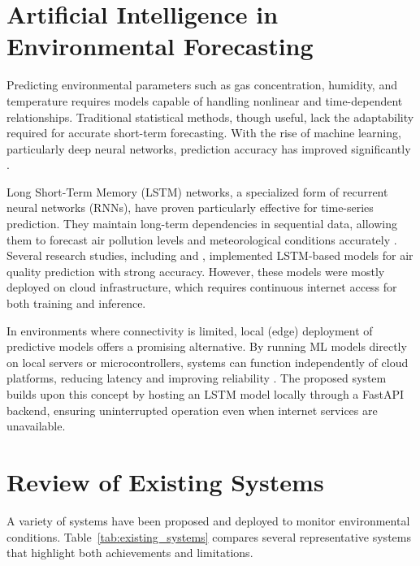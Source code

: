\section{Artificial Intelligence in Environmental Forecasting}

Predicting environmental parameters such as gas concentration, humidity, and temperature requires models capable of handling nonlinear and time-dependent relationships. Traditional statistical methods, though useful, lack the adaptability required for accurate short-term forecasting. With the rise of machine learning, particularly deep neural networks, prediction accuracy has improved significantly \cite{ml_environmental2023}.

Long Short-Term Memory (LSTM) networks, a specialized form of recurrent neural networks (RNNs), have proven particularly effective for time-series prediction. They maintain long-term dependencies in sequential data, allowing them to forecast air pollution levels and meteorological conditions accurately \cite{lstm_forecasting2021}. Several research studies, including \cite{aiweather2023} and \cite{lstm_aqi2022}, implemented LSTM-based models for air quality prediction with strong accuracy. However, these models were mostly deployed on cloud infrastructure, which requires continuous internet access for both training and inference.

In environments where connectivity is limited, local (edge) deployment of predictive models offers a promising alternative. By running ML models directly on local servers or microcontrollers, systems can function independently of cloud platforms, reducing latency and improving reliability \cite{edge_ai2022}. The proposed system builds upon this concept by hosting an LSTM model locally through a FastAPI backend, ensuring uninterrupted operation even when internet services are unavailable.

\section{Review of Existing Systems}

A variety of systems have been proposed and deployed to monitor environmental conditions. Table~\ref{tab:existing_systems} compares several representative systems that highlight both achievements and limitations.

